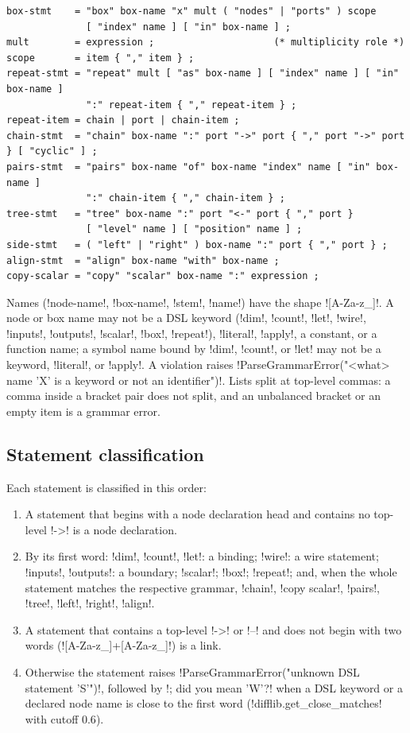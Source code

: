 \begin{lstlisting}[style=grammar,caption={DSL grammar. Spaces between tokens are free except where a keyword needs one.},label={lst:language-dsl}]
box-stmt    = "box" box-name "x" mult ( "nodes" | "ports" ) scope
              [ "index" name ] [ "in" box-name ] ;
mult        = expression ;                     (* multiplicity role *)
scope       = item { "," item } ;
repeat-stmt = "repeat" mult [ "as" box-name ] [ "index" name ] [ "in" box-name ]
              ":" repeat-item { "," repeat-item } ;
repeat-item = chain | port | chain-item ;
chain-stmt  = "chain" box-name ":" port "->" port { "," port "->" port } [ "cyclic" ] ;
pairs-stmt  = "pairs" box-name "of" box-name "index" name [ "in" box-name ]
              ":" chain-item { "," chain-item } ;
tree-stmt   = "tree" box-name ":" port "<-" port { "," port }
              [ "level" name ] [ "position" name ] ;
side-stmt   = ( "left" | "right" ) box-name ":" port { "," port } ;
align-stmt  = "align" box-name "with" box-name ;
copy-scalar = "copy" "scalar" box-name ":" expression ;
\end{lstlisting}

Names (\code!node-name!, \code!box-name!, \code!stem!, \code!name!) have the shape \code![A-Za-z_]\w*!. A node or box name may not be a DSL keyword (\code!dim!, \code!count!, \code!let!, \code!wire!, \code!inputs!, \code!outputs!, \code!scalar!, \code!box!, \code!repeat!), \code!literal!, \code!apply!, a constant, or a function name; a symbol name bound by \code!dim!, \code!count!, or \code!let! may not be a keyword, \code!literal!, or \code!apply!. A violation raises \code!ParseGrammarError("<what> name 'X' is a keyword or not an identifier")!. Lists split at top-level commas: a comma inside a bracket pair does not split, and an unbalanced bracket or an empty item is a grammar error.

\subsection{Statement classification}

Each statement is classified in this order:
\begin{enumerate}
\item A statement that begins with a node declaration head and contains no top-level \code!->! is a node declaration.
\item By its first word: \code!dim!, \code!count!, \code!let!: a binding; \code!wire!: a wire statement; \code!inputs!, \code!outputs!: a boundary; \code!scalar!; \code!box!; \code!repeat!; and, when the whole statement matches the respective grammar, \code!chain!, \code!copy scalar!, \code!pairs!, \code!tree!, \code!left!, \code!right!, \code!align!.
\item A statement that contains a top-level \code!->! or \code!--! and does not begin with two words (\code![A-Za-z_]\w*\s+[A-Za-z_]!) is a link.
\item Otherwise the statement raises \code!ParseGrammarError("unknown DSL statement 'S'")!, followed by \code!; did you mean 'W'?! when a DSL keyword or a declared node name is close to the first word (\py!difflib.get_close_matches! with cutoff $0.6$).
\end{enumerate}

